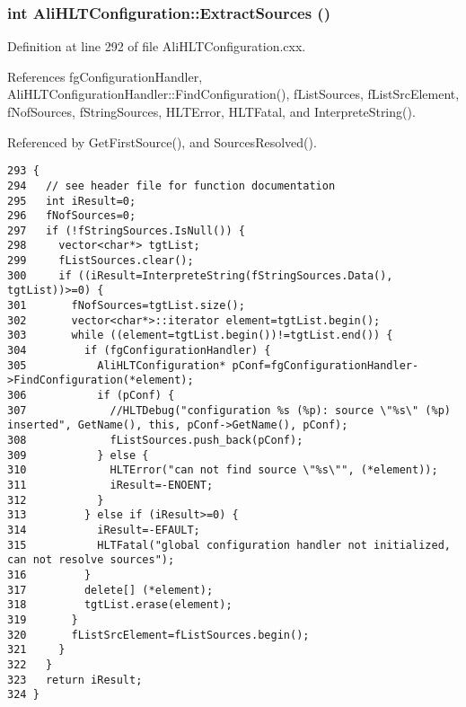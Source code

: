 \subsubsection{\setlength{\rightskip}{0pt plus 5cm}int Ali\-HLTConfiguration::Extract\-Sources ()\hspace{0.3cm}{\tt  [private]}}\label{classAliHLTConfiguration_d0}




Definition at line 292 of file Ali\-HLTConfiguration.cxx.

References fg\-Configuration\-Handler, Ali\-HLTConfiguration\-Handler::Find\-Configuration(), f\-List\-Sources, f\-List\-Src\-Element, f\-Nof\-Sources, f\-String\-Sources, HLTError, HLTFatal, and Interprete\-String().

Referenced by Get\-First\-Source(), and Sources\-Resolved().

\footnotesize\begin{verbatim}293 {
294   // see header file for function documentation
295   int iResult=0;
296   fNofSources=0;
297   if (!fStringSources.IsNull()) {
298     vector<char*> tgtList;
299     fListSources.clear();
300     if ((iResult=InterpreteString(fStringSources.Data(), tgtList))>=0) {
301       fNofSources=tgtList.size();
302       vector<char*>::iterator element=tgtList.begin();
303       while ((element=tgtList.begin())!=tgtList.end()) {
304         if (fgConfigurationHandler) {
305           AliHLTConfiguration* pConf=fgConfigurationHandler->FindConfiguration(*element);
306           if (pConf) {
307             //HLTDebug("configuration %s (%p): source \"%s\" (%p) inserted", GetName(), this, pConf->GetName(), pConf);
308             fListSources.push_back(pConf);
309           } else {
310             HLTError("can not find source \"%s\"", (*element));
311             iResult=-ENOENT;
312           }
313         } else if (iResult>=0) {
314           iResult=-EFAULT;
315           HLTFatal("global configuration handler not initialized, can not resolve sources");
316         }
317         delete[] (*element);
318         tgtList.erase(element);
319       }
320       fListSrcElement=fListSources.begin();
321     }
322   }
323   return iResult;
324 }
\end{verbatim}\normalsize 


